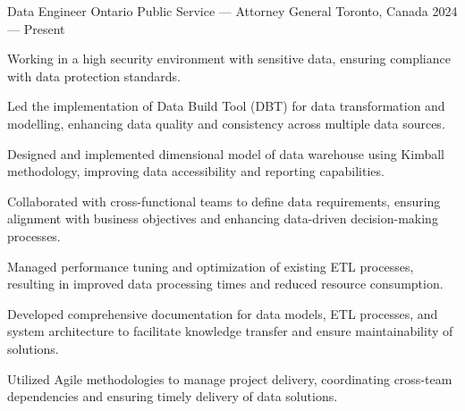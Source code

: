 
\begin{cventries}


\cventry%
 {Data Engineer}
 {Ontario Public Service --- Attorney General}
 {Toronto, Canada}
 {2024 --- Present}
 {
	\begin{cvitems}
		\item Working in a high security environment with sensitive data, ensuring compliance with data protection standards.
		\item Led the implementation of Data Build Tool (DBT) for data transformation and modelling, enhancing data quality and consistency across multiple data sources.
		\item Designed and implemented dimensional model of data warehouse using Kimball methodology, improving data accessibility and reporting capabilities.
		\item Collaborated with cross-functional teams to define data requirements, ensuring alignment with business objectives and enhancing data-driven decision-making processes.
		\item Managed performance tuning and optimization of existing ETL processes, resulting in improved data processing times and reduced resource consumption.
		\item Developed comprehensive documentation for data models, ETL processes, and system architecture to facilitate knowledge transfer and ensure maintainability of solutions.
		\item Utilized Agile methodologies to manage project delivery, coordinating cross-team dependencies and ensuring timely delivery of data solutions.
	\end{cvitems}
 }


\end{cventries}
